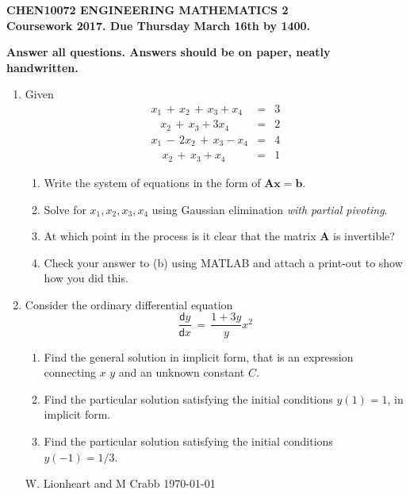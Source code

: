\documentclass[12pt]{article}
\def\bA{\mathbf{A}}
\newcommand{\dif}{\mathsf{d}}
\begin{document}
\begin{center}{\bf\large
CHEN10072 ENGINEERING MATHEMATICS 2
\\
Coursework 2017. Due Thursday March 16th by 1400. 
}
\end{center}
\begin{center}{\bf
Answer all questions. Answers should be on paper, neatly handwritten.
}
\end{center}

\begin{enumerate}

\item 
Given
\vspace{-0.5cm}
\begin{eqnarray*}
x_1\,+\,x_2\,+\,x_3 + x_4&=&3\\
\,\,\,\,\,x_2\,+\,x_3 + 3x_4&=&2\\
x_1\,-\,2x_2\,+\,x_3 - x_4&=&4\\
\,\,\,\,\,\,x_2\,+\,x_3 + x_4&=&1
\end{eqnarray*}
            \begin{enumerate}
            \item Write the system of  equations in the form of $\bA \mathbf{x}=\mathbf{b}$.
             
            \item  Solve for $x_1,x_2,x_3,x_4$ using Gaussian elimination {\em with partial  pivoting}.
            \item At which point in the process is it clear that the matrix $\mathbf{A}$ is invertible?
            \item Check your answer to (b) using  MATLAB and attach a print-out to show how you did this.
    \end{enumerate}
	

\item
Consider the ordinary differential equation
$$ \frac{\dif y}{\dif x}\,=\,  \frac{1+3y}{y} x^2 $$
\begin{enumerate}
\item
Find the general solution in implicit form, that is an expression connecting  $x$ $y$ and an unknown constant $C$.
\item Find the particular solution satisfying the initial conditions $y(1)=1$,  in implicit form. 
\item Find the particular solution satisfying the initial conditions $y(-1)=1/3$. 
\end{enumerate}
\vspace{4cm}

\tiny{W. Lionheart and M Crabb \today}



\end{enumerate}
\end{document}
